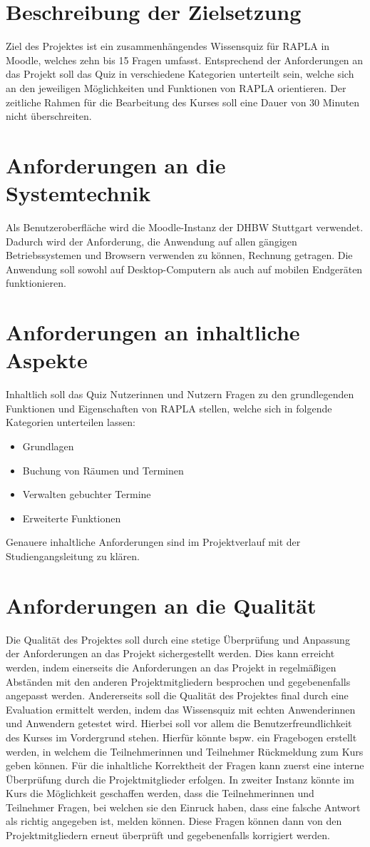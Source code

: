 \section{Beschreibung der Zielsetzung}
Ziel des Projektes ist ein zusammenhängendes Wissensquiz für \acs{RAPLA} in Moodle, welches zehn bis 15 Fragen umfasst.
Entsprechend der Anforderungen an das Projekt soll das Quiz in verschiedene Kategorien unterteilt sein, welche sich an den
jeweiligen Möglichkeiten und Funktionen von \acs{RAPLA} orientieren. Der zeitliche Rahmen für die Bearbeitung des Kurses soll
eine Dauer von 30 Minuten nicht überschreiten.
\section{Anforderungen an die Systemtechnik}
Als Benutzeroberfläche wird die Moodle-Instanz der DHBW Stuttgart verwendet. Dadurch wird der Anforderung, die Anwendung auf allen
gängigen Betriebssystemen und Browsern verwenden zu können, Rechnung getragen. Die Anwendung soll sowohl auf Desktop-Computern als auch
auf mobilen Endgeräten funktionieren.
\section{Anforderungen an inhaltliche Aspekte}
Inhaltlich soll das Quiz Nutzerinnen und Nutzern Fragen zu den grundlegenden Funktionen und Eigenschaften von \acs{RAPLA} stellen, welche
sich in folgende Kategorien unterteilen lassen:
\begin{itemize}
    \item Grundlagen
    \item Buchung von Räumen und Terminen
    \item Verwalten gebuchter Termine
    \item Erweiterte Funktionen
\end{itemize}
Genauere inhaltliche Anforderungen sind im Projektverlauf mit der Studiengangsleitung zu klären.
\section{Anforderungen an die Qualität}
Die Qualität des Projektes soll durch eine stetige Überprüfung und Anpassung der Anforderungen an das Projekt sichergestellt werden.
Dies kann erreicht werden, indem einerseits die Anforderungen an das Projekt in regelmäßigen Abständen mit den
anderen Projektmitgliedern besprochen und gegebenenfalls angepasst werden. Andererseits soll die Qualität des Projektes final durch eine Evaluation
ermittelt werden, indem das Wissensquiz mit echten Anwenderinnen und Anwendern getestet wird. Hierbei soll vor allem die Benutzerfreundlichkeit
des Kurses im Vordergrund stehen. Hierfür könnte bspw. ein Fragebogen erstellt werden, in welchem die Teilnehmerinnen und Teilnehmer Rückmeldung
zum Kurs geben können. Für die inhaltliche Korrektheit der Fragen kann zuerst eine interne Überprüfung durch die Projektmitglieder erfolgen.
In zweiter Instanz könnte im Kurs die Möglichkeit geschaffen werden, dass die Teilnehmerinnen und Teilnehmer Fragen, bei welchen sie den Einruck haben,
dass eine falsche Antwort als richtig angegeben ist, melden können. Diese Fragen können dann von den Projektmitgliedern erneut überprüft und gegebenenfalls
korrigiert werden.
